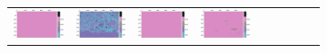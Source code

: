 \documentclass{ipol}
\begin{document}
\begin{figure}[ht]
\begin{subfigure}[t]{\linewidth}
\begin{tabular}{ccccccccc}
                \includegraphics[width=\s]{images/windmill/DCB/bid_64_grids.png}&
                \includegraphics[width=\s]{images/windmill/DHT/bid_64_grids.png}&
                \includegraphics[width=\s]{images/windmill/LINEAR/bid_64_grids.png}&
                \includegraphics[width=\s]{images/windmill/PPG/bid_64_grids.png}&

\end{tabular}
\end{subfigure}
\end{figure}
\end{document}
